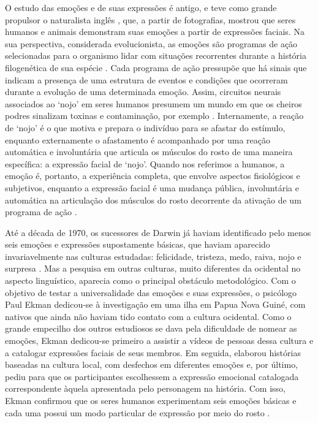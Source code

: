 \documentclass[portuguese]{textolivre}
\begin{document}
O estudo das emoções e de suas expressões é antigo, e teve como grande propulsor o naturalista inglês  \citeyear{darwin_expression_1872}, que, a partir de fotografias, mostrou que seres humanos e animais demonstram suas emoções a partir de expressões faciais. Na sua perspectiva, considerada evolucionista, as emoções são programas de ação selecionadas para o organismo lidar com situações recorrentes durante a história filogenética de sua espécie \cite{matsumoto_facial_2008, tooby_evolutionary_2008}. Cada programa de ação pressupõe que há sinais que indicam a presença de uma estrutura de eventos e condições que ocorreram durante a evolução de uma determinada emoção. Assim, circuitos neurais associados ao ‘nojo’ em seres humanos presumem um mundo em que os cheiros podres sinalizam toxinas e contaminação, por exemplo \cite{ matsumoto_facial_2008, matsumoto_facial_2008}. Internamente, a reação de ‘nojo’ é o que motiva e prepara o indivíduo para se afastar do estímulo, enquanto externamente o afastamento é acompanhado por uma reação automática e involuntária que articula os músculos do rosto de uma maneira específica: a expressão facial de ‘nojo’. Quando nos referimos a humanos, a emoção é, portanto, a experiência completa, que envolve aspectos fisiológicos e subjetivos, enquanto a expressão facial é uma mudança pública, involuntária e automática na articulação dos músculos do rosto decorrente da ativação de um programa de ação \cite{ekman_argument_1989}. 

Até a década de 1970, os sucessores de Darwin já haviam identificado pelo menos seis emoções e expressões supostamente básicas, que haviam aparecido invariavelmente nas culturas estudadas: felicidade, tristeza, medo, raiva, nojo e surpresa \cite{vasconcellos_psicopatia_2014}. Mas a pesquisa em outras culturas, muito diferentes da ocidental no aspecto linguístico, aparecia como o principal obstáculo metodológico. Com o objetivo de testar a universalidade das emoções e suas expressões, o psicólogo Paul Ekman dedicou-se à investigação em uma ilha em Papua Nova Guiné, com nativos que ainda não haviam tido contato com a cultura ocidental. Como o grande empecilho dos outros estudiosos se dava pela dificuldade de nomear as emoções, Ekman dedicou-se primeiro a assistir a vídeos de pessoas dessa cultura e a catalogar expressões faciais de seus membros. Em seguida, elaborou histórias baseadas na cultura local, com desfechos em diferentes emoções e, por último, pediu para que os participantes escolhessem a expressão emocional catalogada correspondente àquela apresentada pelo personagem na história. Com isso, Ekman confirmou que os seres humanos experimentam seis emoções básicas e cada uma possui um modo particular de expressão por meio do rosto \cite{ekman_argument_1989}. 
\end{document}
